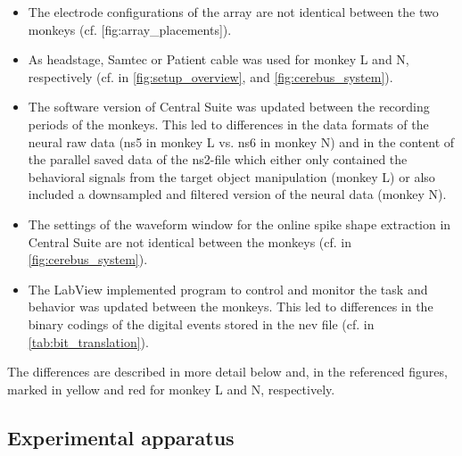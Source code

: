 {\begin{itemize}
 \item The electrode configurations of the array are not identical between the two monkeys (cf. [fig:array\_placements]).
 \item As headstage, Samtec or Patient cable was used for monkey L and N, respectively (cf. in \cref{fig:setup_overview}, and \cref{fig:cerebus_system}).
 \item The software version of Central Suite was updated between the recording periods of the monkeys. This led to differences in the data formats of the neural raw data (ns5 in monkey L vs. ns6 in monkey N) and in the content of the parallel saved data of the ns2-file which either only contained the behavioral signals from the target object manipulation (monkey L) or also included a downsampled and filtered version of the neural data (monkey N).
 \item The settings of the waveform window for the online spike shape extraction in Central Suite are not identical between the monkeys (cf. in \cref{fig:cerebus_system}).
 \item The LabView implemented program to control and monitor the task and behavior was updated between the monkeys. This led to differences in the binary codings of the digital events stored in the nev file (cf. in \cref{tab:bit_translation}).
\end{itemize}

The differences are described in more detail below and, in the referenced figures, marked in yellow and red for monkey L and N, respectively. 



\subsection{Experimental apparatus}

}
